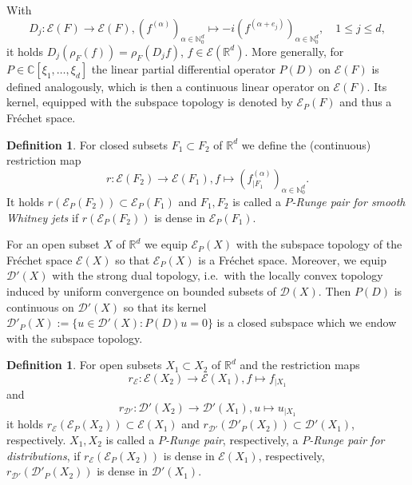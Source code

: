 \documentclass[a4paper,10pt]{amsart}
\newtheorem*{crucial lemma}{Lemma \ref{lem:nice polynomial2}}
\theoremstyle{definition}
\newtheorem{definition}[theorem]{Definition}
\newcommand{\R}{\mathbb{R}}
\newcommand{\C}{\mathbb{C}}
\newcommand{\N}{\mathbb{N}}
\begin{document}
With
\[D_j:\mathscr{E}(F)\rightarrow\mathscr{E}(F),(f^{(\alpha)})_{\alpha\in\N_0^d}\mapsto-i(f^{(\alpha+e_j)})_{\alpha\in\N_0^d}, \quad 1\leq j\leq d,\]
it holds $D_j(\rho_F(f))=\rho_F(D_j f)$, $f\in\mathscr{E}(\R^d)$. More generally, for $P\in\C[\xi_1,\ldots,\xi_d]$ the linear partial differential operator $P(D)$ on $\mathscr{E}(F)$ is defined analogously, which is then a continuous linear operator on $\mathscr{E}(F)$. Its kernel, equipped with the subspace topology is denoted by $\mathscr{E}_P(F)$ and thus a Fr\'echet space.

\begin{definition}\label{def:P-Runge for Whitney}
	For closed subsets $F_1\subset F_2$ of $\R^d$ we define the (continuous) restriction map
	\[r\colon\mathscr{E}(F_2)\rightarrow\mathscr{E}(F_1), f\mapsto \left(f^{(\alpha)}_{\mid F_1}\right)_{\alpha\in\N_0^d}.\]
	  It holds $r\left(\mathscr{E}_P(F_2)\right)\subset \mathscr{E}_P(F_1)$ and  $F_1, F_2$ is called a \emph{$P$-Runge pair for smooth Whitney jets} if  $r\left(\mathscr{E}_P(F_2)\right)$ is dense in $\mathscr{E}_P(F_1)$.
\end{definition}



For an open subset $X$ of $\R^d$ we equip $\mathscr{E}_P(X)$ with the subspace topology of the Fr\'echet space $\mathscr{E}(X)$ so that $\mathscr{E}_P(X)$ is a Fr\'echet space. Moreover, we equip $\mathscr{D}'(X)$ with the strong dual topology, i.e.~with the locally convex topology induced by uniform convergence on bounded subsets of $\mathscr{D}(X)$. Then $P(D)$ is continuous on $\mathscr{D}'(X)$ so that its kernel $\mathscr{D}'_P(X):=\{u\in\mathscr{D}'(X)\colon P(D)u=0\}$ is a closed subspace which we endow with the subspace topology.

\begin{definition}
	For open subsets $X_1\subset X_2$ of $\R^d$ and the restriction maps
	\[r_\mathscr{E}\colon\mathscr{E}(X_2)\rightarrow\mathscr{E}(X_1), f\mapsto f_{\mid X_1}\]
	and 
	\[r_{\mathscr{D}'}\colon\mathscr{D}'(X_2)\rightarrow\mathscr{D}'(X_1), u\mapsto u_{\mid X_1}\]
	it holds $r_\mathscr{E}\left(\mathscr{E}_P(X_2)\right)\subset\mathscr{E}(X_1)$ and $r_{\mathscr{D}'}\left(\mathscr{D}'_P(X_2)\right)\subset\mathscr{D}'(X_1)$, respectively. $X_1, X_2$ is called a \emph{$P$-Runge pair}, respectively, a \emph{$P$-Runge pair for distributions}, if $r_\mathscr{E}\left(\mathscr{E}_P(X_2)\right)$ is dense in $\mathscr{E}(X_1)$, respectively, $r_{\mathscr{D}'}\left(\mathscr{D}'_P(X_2)\right)$ is dense in $\mathscr{D}'(X_1)$.
\end{definition}
\end{document}
